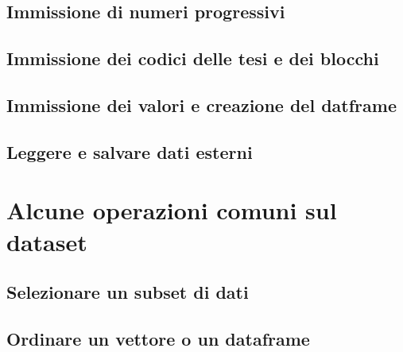 \documentclass[a4paper,12pt,oneside]{book}
\begin{document}
\hypertarget{immissione-di-numeri-progressivi}{%
\subsection*{Immissione di numeri progressivi}\label{immissione-di-numeri-progressivi}}

\hypertarget{immissione-dei-codici-delle-tesi-e-dei-blocchi}{%
\subsection*{Immissione dei codici delle tesi e dei blocchi}\label{immissione-dei-codici-delle-tesi-e-dei-blocchi}}

\hypertarget{immissione-dei-valori-e-creazione-del-datframe}{%
\subsection*{Immissione dei valori e creazione del datframe}\label{immissione-dei-valori-e-creazione-del-datframe}}

\hypertarget{leggere-e-salvare-dati-esterni}{%
\subsection*{Leggere e salvare dati esterni}\label{leggere-e-salvare-dati-esterni}}

\hypertarget{alcune-operazioni-comuni-sul-dataset}{%
\section*{Alcune operazioni comuni sul dataset}\label{alcune-operazioni-comuni-sul-dataset}}

\hypertarget{selezionare-un-subset-di-dati}{%
\subsection*{Selezionare un subset di dati}\label{selezionare-un-subset-di-dati}}

\hypertarget{ordinare-un-vettore-o-un-dataframe}{%
\subsection*{Ordinare un vettore o un dataframe}\label{ordinare-un-vettore-o-un-dataframe}}
\end{document}
